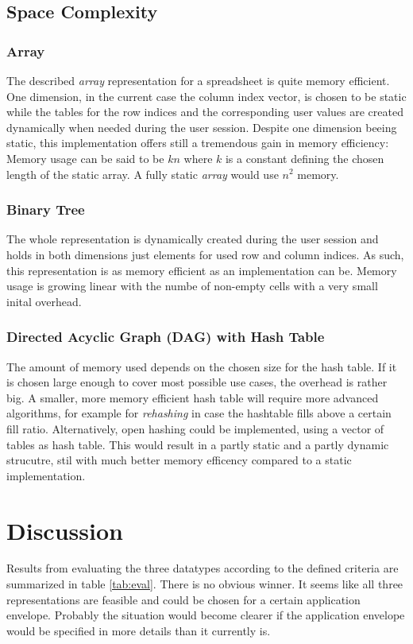 \documentclass[a4paper,11pt,twoside]{article}
\begin{document}
\subsection{Space Complexity}
\subsubsection{Array}
The described \textit{array} representation for a spreadsheet is quite memory
efficient. One dimension, in the current case the column index vector,
is chosen to be static while the tables for the row indices
and the corresponding user values are created dynamically when needed
during the user session. Despite one dimension beeing static, this
implementation offers still a tremendous gain in memory efficiency:
Memory usage can be said to be $kn$ where $k$ is a constant defining
the chosen length of the static array. A fully static \textit{array}
would use $n^2$ memory.  

\subsubsection{Binary Tree}
The whole representation is dynamically created during the user
session and holds in both dimensions just elements for used row and
column indices. As such, this representation is as memory efficient as
an implementation can be. Memory usage is growing linear with the
numbe of non-empty cells with a very small inital overhead.


\subsubsection{Directed Acyclic Graph (DAG) with Hash Table}
The amount of memory used depends on the chosen size for the hash
table. If it is chosen large enough to cover most possible use cases,
the overhead is rather big. A smaller, more memory efficient hash
table will require more advanced algorithms, for example for \textit{rehashing}
in case the hashtable fills above a certain fill ratio. Alternatively,
open hashing could be implemented, using a vector of tables as hash
table. This would result in a partly static and a partly dynamic
strucutre, stil with much better  memory efficency compared to a
static implementation.  


\section{Discussion}
Results from evaluating the three datatypes according to the defined
criteria are summarized in table \ref{tab:eval}. There is no obvious
winner. It seems like all three representations are feasible and
could be chosen for a certain application envelope. Probably the
situation would become clearer if the application envelope would be
specified in more details than it currently is.
\end{document}
